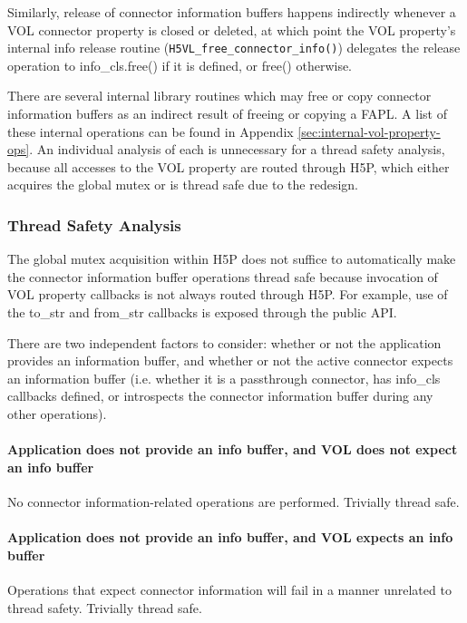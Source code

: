 \documentclass{article}
\begin{document}
Similarly, release of connector information buffers happens indirectly whenever a VOL connector property is closed or deleted, at which point the VOL property's internal info release routine (\texttt{H5VL\_free\_connector\_info()}) delegates the release operation to info\_cls.free() if it is defined, or free() otherwise.

There are several internal library routines which may free or copy connector information buffers as an indirect result of freeing or copying a FAPL. A list of these internal operations can be found in Appendix \ref{sec:internal-vol-property-ops}. An individual analysis of each is unnecessary for a thread safety analysis, because all accesses to the VOL property are routed through H5P, which either acquires the global mutex or is thread safe due to the redesign.



\subsubsection{Thread Safety Analysis}

The global mutex acquisition within H5P does not suffice to automatically make the connector information buffer operations thread safe because invocation of VOL property callbacks is not always routed through H5P. For example, use of the to\_str and from\_str callbacks is exposed through the public API. 

There are two independent factors to consider: whether or not the application provides an information buffer, and whether or not the active connector expects an information buffer (i.e. whether it is a passthrough connector, has info\_cls callbacks defined, or introspects the connector information buffer during any other operations).

\paragraph{Application does not provide an info buffer, and VOL does not expect an info buffer}

No connector information-related operations are performed. Trivially thread safe.

\paragraph{Application does not provide an info buffer, and VOL expects an info buffer}

Operations that expect connector information will fail in a manner unrelated to thread safety. Trivially thread safe.
\end{document}
